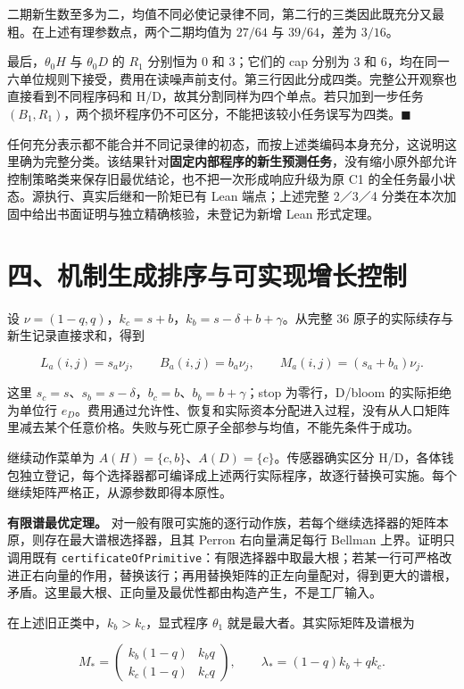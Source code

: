 \documentclass[
  11pt,
  oneside]{book}
\begin{document}
二期新生数至多为二，均值不同必使记录律不同，第二行的三类因此既充分又最粗。在上述有理参数点，两个二期均值为 \(27/64\) 与 \(39/64\)，差为 \(3/16\)。

最后，\(\theta_0H\) 与 \(\theta_0D\) 的 \(R_1\) 分别恒为 0 和 3；它们的 cap 分别为 3 和 6，均在同一六单位规则下接受，费用在读噪声前支付。第三行因此分成四类。完整公开观察也直接看到不同程序码和 H/D，故其分割同样为四个单点。若只加到一步任务 \((B_1,R_1)\)，两个损坏程序仍不可区分，不能把该较小任务误写为四类。\(\blacksquare\)

任何充分表示都不能合并不同记录律的初态，而按上述类编码本身充分，这说明这里确为完整分类。该结果针对\textbf{固定内部程序的新生预测任务}，没有缩小原外部允许控制策略类来保存旧最优结论，也不把一次形成响应升级为原 C1 的全任务最小状态。源执行、真实后继和一阶矩已有 Lean 端点；上述完整 2／3／4 分类在本次加固中给出书面证明与独立精确核验，未登记为新增 Lean 形式定理。

\section{四、机制生成排序与可实现增长控制}\label{ux56dbux673aux5236ux751fux6210ux6392ux5e8fux4e0eux53efux5b9eux73b0ux589eux957fux63a7ux5236}

设 \(\nu=(1-q,q)\)，\(k_c=s+b\)，\(k_b=s-\delta+b+\gamma\)。从完整 36 原子的实际续存与新生记录直接求和，得到

\[L_a(i,j)=s_a\nu_j,\qquad B_a(i,j)=b_a\nu_j,\qquad
M_a(i,j)=(s_a+b_a)\nu_j.\]

这里 \(s_c=s\)、\(s_b=s-\delta\)，\(b_c=b\)、\(b_b=b+\gamma\)；stop 为零行，D/bloom 的实际拒绝为单位行 \(e_D\)。费用通过允许性、恢复和实际资本分配进入过程，没有从人口矩阵里减去某个任意价格。失败与死亡原子全部参与均值，不能先条件于成功。

继续动作菜单为 \(A(H)=\{c,b\}\)、\(A(D)=\{c\}\)。传感器确实区分 H/D，各体钱包独立登记，每个选择器都可编译成上述两行实际程序，故逐行替换可实施。每个继续矩阵严格正，从源参数即得本原性。

\textbf{有限谱最优定理。} 对一般有限可实施的逐行动作族，若每个继续选择器的矩阵本原，则存在最大谱根选择器，且其 Perron 右向量满足每行 Bellman 上界。证明只调用既有 \nolinkurl{certificateOfPrimitive}：有限选择器中取最大根；若某一行可严格改进正右向量的作用，替换该行；再用替换矩阵的正左向量配对，得到更大的谱根，矛盾。这里最大根、正向量及最优性都由构造产生，不是工厂输入。

在上述旧正类中，\(k_b>k_c\)，显式程序 \(\theta_1\) 就是最大者。其实际矩阵及谱根为

\[M_* = \begin{pmatrix}k_b(1-q)&k_bq\\k_c(1-q)&k_cq\end{pmatrix},\qquad
\lambda_*=(1-q)k_b+qk_c.\]
\end{document}
